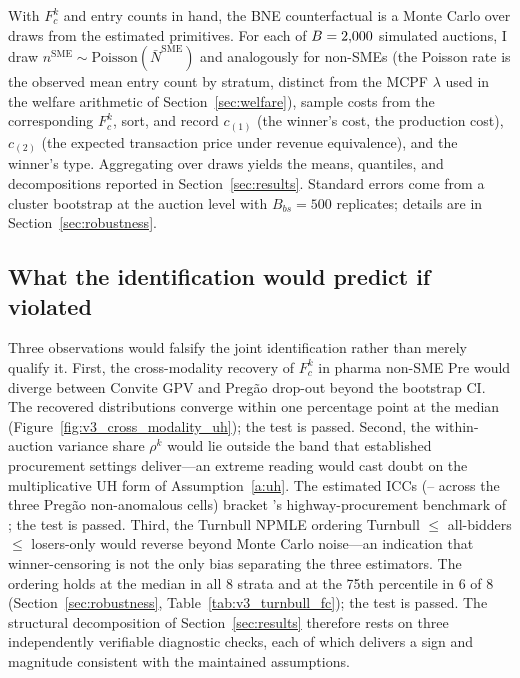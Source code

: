 With $F_c^k$ and entry counts in hand, the BNE counterfactual is a Monte Carlo over draws from the estimated primitives. For each of $B = 2{,}000$ simulated auctions, I draw $n^{\text{SME}} \sim \mathrm{Poisson}(\bar N^{\text{SME}})$ and analogously for non-SMEs (the Poisson rate is the observed mean entry count by stratum, distinct from the MCPF $\lambda$ used in the welfare arithmetic of Section~\ref{sec:welfare}), sample costs from the corresponding $F_c^k$, sort, and record $c_{(1)}$ (the winner's cost, the production cost), $c_{(2)}$ (the expected transaction price under revenue equivalence), and the winner's type. Aggregating over draws yields the means, quantiles, and decompositions reported in Section~\ref{sec:results}. Standard errors come from a cluster bootstrap at the auction level with $B_{bs} = 500$ replicates; details are in Section~\ref{sec:robustness}.

\subsection{What the identification would predict if violated}\label{sec:falsifiability}

Three observations would falsify the joint identification rather than merely qualify it. First, the cross-modality recovery of $F_c^k$ in pharma non-SME Pre would diverge between Convite GPV and Preg\~ao drop-out beyond the bootstrap CI. The recovered distributions converge within one percentage point at the median (Figure~\ref{fig:v3_cross_modality_uh}); the test is passed. Second, the within-auction variance share $\rho^k$ would lie outside the band that established procurement settings deliver---an extreme reading would cast doubt on the multiplicative UH form of Assumption~\ref{a:uh}. The estimated ICCs (\iccNpSme--\iccPharmaNonSme{} across the three Preg\~ao non-anomalous cells) bracket \citet{krasnokutskaya2011}'s highway-procurement benchmark of \krasICC; the test is passed. Third, the Turnbull NPMLE ordering Turnbull $\le$ all-bidders $\le$ losers-only would reverse beyond Monte Carlo noise---an indication that winner-censoring is not the only bias separating the three estimators. The ordering holds at the median in all 8 strata and at the 75th percentile in 6 of 8 (Section~\ref{sec:robustness}, Table~\ref{tab:v3_turnbull_fc}); the test is passed. The structural decomposition of Section~\ref{sec:results} therefore rests on three independently verifiable diagnostic checks, each of which delivers a sign and magnitude consistent with the maintained assumptions.
